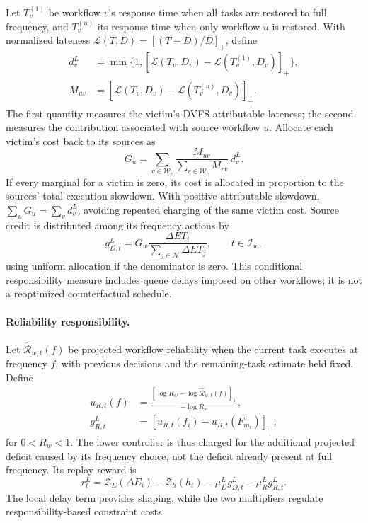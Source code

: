 \documentclass[10pt,twocolumn]{article}
\begin{document}
Let $T_v^{(1)}$ be workflow $v$'s response time when all tasks are
restored to full frequency, and $T_v^{(u)}$ its response time when only
workflow $u$ is restored. With normalized lateness
$\mathcal L(T,D)=[(T-D)/D]_+$, define
\begin{align}
 d_v^L&=\min\{1,[\mathcal L(T_v,D_v)-\mathcal L(T_v^{(1)},D_v)]_+\},\nonumber\\
 M_{uv}&=[\mathcal L(T_v,D_v)-\mathcal L(T_v^{(u)},D_v)]_+.
 \label{eq:method_counterfactual_marginal}
\end{align}
The first quantity measures the victim's DVFS-attributable lateness;
the second measures the contribution associated with source workflow
$u$. Allocate each victim's cost back to its sources as
\begin{equation}
 G_u=\sum_{v\in\mathcal W_e}
 \frac{M_{uv}}{\sum_{r\in\mathcal W_e}M_{rv}}\,d_v^L.
 \label{eq:method_source_credit}
\end{equation}
If every marginal for a victim is zero, its cost is allocated in
proportion to the sources' total execution slowdown. With positive
attributable slowdown, $\sum_uG_u=\sum_vd_v^L$, avoiding repeated
charging of the same victim cost. Source credit is distributed among
its frequency actions by
\begin{equation}
 g_{D,t}^L=G_w\frac{\Delta ET_i}
 {\sum_{j\in\mathcal N}\Delta ET_j},\qquad t\in\mathcal I_w,
 \label{eq:method_low_deadline_credit}
\end{equation}
using uniform allocation if the denominator is zero. This conditional
responsibility measure includes queue delays imposed on other
workflows; it is not a reoptimized counterfactual schedule.

\paragraph{Reliability responsibility.}
Let $\widehat{\mathcal R}_{w,t}(f)$ be projected workflow reliability
when the current task executes at frequency $f$, with previous decisions and the
remaining-task estimate held fixed. Define
\begin{align}
 u_{R,t}(f)&=
 \frac{[\log R_w-\log\widehat{\mathcal R}_{w,t}(f)]_+}{-\log R_w},\nonumber\\
 g_{R,t}^L&=[u_{R,t}(f_i)-u_{R,t}(F_{m_i})]_+,
 \label{eq:method_low_reliability}
\end{align}
for $0<R_w<1$. The lower controller is thus charged for the additional
projected deficit caused by its frequency choice, not the deficit
already present at full frequency. Its replay reward is
\begin{equation}
 r_t^L=\mathcal Z_E(\Delta E_i)-\mathcal Z_h(h_t)
 -\mu_D^L g_{D,t}^L-\mu_R^L g_{R,t}^L.
 \label{eq:method_low_reward}
\end{equation}
The local delay term provides shaping, while the two multipliers
regulate responsibility-based constraint costs.
\end{document}
